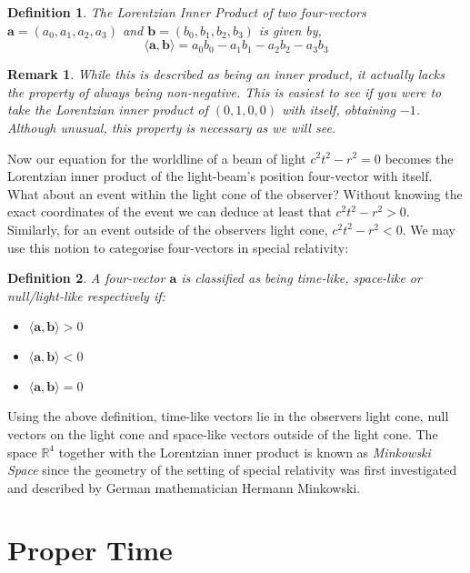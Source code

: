\documentclass[a4paper,12pt,draft]{report}
\newtheorem{remark}{Remark}
\newtheorem{definition}{Definition}
\begin{document}
\begin{definition}
The Lorentzian Inner Product of two four-vectors\\$\mathbf{a} = (a_0, a_1, a_2, a_3)$ and $\mathbf{b} = (b_0, b_1, b_2, b_3)$ is given by,
$$
\langle\mathbf{a}, \mathbf{b}\rangle = a_0b_0 - a_1b_1 - a_2b_2 - a_3b_3
$$
\end{definition}

\begin{remark}
While this is described as being an inner product, it actually lacks the property of always being non-negative. This is easiest to see if you were to take the Lorentzian inner product of $(0, 1, 0, 0)$ with itself, obtaining $-1$. Although unusual, this property is necessary as we will see.
\end{remark}

Now our equation for the worldline of a beam of light $c^2t^2 - r^2 = 0$ becomes the Lorentzian inner product of the light-beam's position four-vector with itself. What about an event within the light cone of the observer? Without knowing the exact coordinates of the event we can deduce at least that $c^2t^2 - r^2 > 0$. Similarly, for an event outside of the observers light cone, $c^2t^2 - r^2 < 0$. We may use this notion to categorise four-vectors in special relativity:

\begin{definition}
A four-vector $\mathbf{a}$ is classified as being time-like, space-like or null/light-like respectively if:
\begin{itemize}
\item $\langle\mathbf{a}, \mathbf{b}\rangle > 0$
\item $\langle\mathbf{a}, \mathbf{b}\rangle < 0$
\item $\langle\mathbf{a}, \mathbf{b}\rangle = 0$
\end{itemize}
\end{definition}

Using the above definition, time-like vectors lie in the observers light cone, null vectors on the light cone and space-like vectors outside of the light cone. The space $\mathbb{R}^4$ together with the Lorentzian inner product is known as \emph{Minkowski Space} since the geometry of the setting of special relativity was first investigated and described by German mathematician Hermann Minkowski.

\section{Proper Time}
\end{document}
